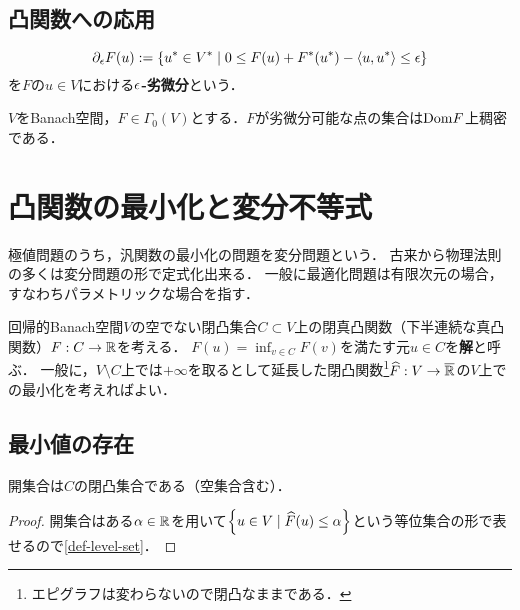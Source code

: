 \documentclass[uplatex,dvipdfmx]{jsreport}
\begin{document}
\subsection{凸関数への応用}

\begin{definition}
    \[\partial_\epsilon F(u):=\left\{u^*\in V^*\mid 0\le F(u)+F^*(u^*)-\langle u,u^*\rangle\le\epsilon\right\}\]
    を$F$の$u\in V$における\textbf{$\epsilon$-劣微分}という．
\end{definition}

\begin{theorem}
    
\end{theorem}

\begin{corollary}\label{cor-subdifferentiable-points-of-Banach-operator}
    $V$をBanach空間，$F\in\Gamma_0(V)$とする．$F$が劣微分可能な点の集合は$\mathrm{Dom} F$上稠密である．
\end{corollary}

\section{凸関数の最小化と変分不等式}

\begin{tcolorbox}[colframe=ForestGreen, colback=ForestGreen!10!white,breakable,colbacktitle=ForestGreen!40!white,coltitle=black,fonttitle=\bfseries\sffamily,
title=]
    極値問題のうち，汎関数の最小化の問題を変分問題という．
    古来から物理法則の多くは変分問題の形で定式化出来る．
    一般に最適化問題は有限次元の場合，すなわちパラメトリックな場合を指す．
\end{tcolorbox}

\begin{problem}
    回帰的Banach空間$V$の空でない閉凸集合$C\subset V$上の閉真凸関数（下半連続な真凸関数）$F:C\to\mathbb{R}$を考える．
    $F(u)=\inf_{v\in C}F(v)$を満たす元$u\in C$を\textbf{解}と呼ぶ．
    一般に，$V\setminus C$上では$+\infty$を取るとして延長した閉凸関数\footnote{エピグラフは変わらないので閉凸なままである．}$\widehat{F}:V\to\overline{\mathbb{R}}$の$V$上での最小化を考えればよい．
\end{problem}

\subsection{最小値の存在}

\begin{proposition}
    開集合は$C$の閉凸集合である（空集合含む）．
\end{proposition}
\begin{proof}
    開集合はある$\alpha\in\mathbb{R}$を用いて$\left\{u\in V\mid\widehat{F}(u)\le\alpha\right\}$という等位集合の形で表せるので\ref{def-level-set}．
\end{proof}
\end{document}
